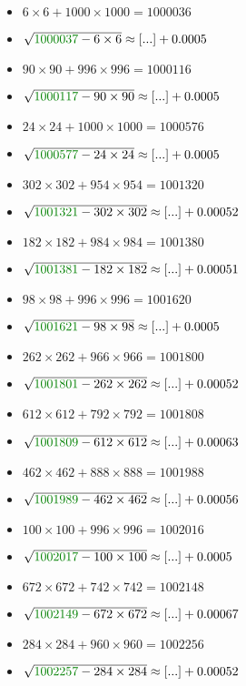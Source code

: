 \documentclass[12pt]{article}
\begin{document}
\begin{multicols}{2}
\begin{itemize}
\item $6\times6 + 1000\times1000 = 1000036$
\item $\sqrt{ {\color{green!50!black}{1000037}} - 6\times 6 } \approx [...] + 0.0005$
\item $90\times90 + 996\times996 = 1000116$
\item $\sqrt{ {\color{green!50!black}{1000117}} - 90\times 90 } \approx [...] + 0.0005$
\item $24\times24 + 1000\times1000 = 1000576$
\item $\sqrt{ {\color{green!50!black}{1000577}} - 24\times 24 } \approx [...] + 0.0005$
\item $302\times302 + 954\times954 = 1001320$
\item $\sqrt{ {\color{green!50!black}{1001321}} - 302\times 302 } \approx [...] + 0.00052$
\item $182\times182 + 984\times984 = 1001380$
\item $\sqrt{ {\color{green!50!black}{1001381}} - 182\times 182 } \approx [...] + 0.00051$
\item $98\times98 + 996\times996 = 1001620$
\item $\sqrt{ {\color{green!50!black}{1001621}} - 98\times 98 } \approx [...] + 0.0005$
\item $262\times262 + 966\times966 = 1001800$
\item $\sqrt{ {\color{green!50!black}{1001801}} - 262\times 262 } \approx [...] + 0.00052$
\item $612\times612 + 792\times792 = 1001808$
\item $\sqrt{ {\color{green!50!black}{1001809}} - 612\times 612 } \approx [...] + 0.00063$
\item $462\times462 + 888\times888 = 1001988$
\item $\sqrt{ {\color{green!50!black}{1001989}} - 462\times 462 } \approx [...] + 0.00056$
\item $100\times100 + 996\times996 = 1002016$
\item $\sqrt{ {\color{green!50!black}{1002017}} - 100\times 100 } \approx [...] + 0.0005$
\item $672\times672 + 742\times742 = 1002148$
\item $\sqrt{ {\color{green!50!black}{1002149}} - 672\times 672 } \approx [...] + 0.00067$
\item $284\times284 + 960\times960 = 1002256$
\item $\sqrt{ {\color{green!50!black}{1002257}} - 284\times 284 } \approx [...] + 0.00052$

\end{itemize}
\end{multicols}
\end{document}
